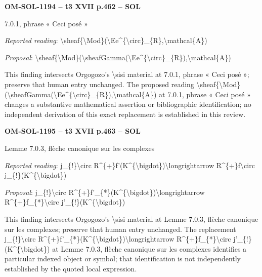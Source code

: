 \par\noindent\textbf{OM-SOL-1194 -- t3 XVII p.462 -- SOL}\par
7.0.1, phrase « Ceci posé »\par
\emph{Reported reading}: \textbackslash{}sheaf\{\textbackslash{}Mod\}(\textbackslash{}Ee\textasciicircum{}\{\textbackslash{}circ\}\_\{R\},\textbackslash{}mathcal\{A\})\par
\emph{Proposal}: \textbackslash{}sheaf\{\textbackslash{}Mod\}(\textbackslash{}sheafGamma(\textbackslash{}Ee\textasciicircum{}\{\textbackslash{}circ\}\_\{R\}),\textbackslash{}mathcal\{A\})\par
This finding intersects Orgogozo's \textbackslash{}sisi material at 7.0.1, phrase « Ceci posé »; preserve that human entry unchanged. The proposed reading \textbackslash{}sheaf\{\textbackslash{}Mod\}(\textbackslash{}sheafGamma(\textbackslash{}Ee\textasciicircum{}\{\textbackslash{}circ\}\_\{R\}),\textbackslash{}mathcal\{A\}) at 7.0.1, phrase « Ceci posé » changes a substantive mathematical assertion or bibliographic identification; no independent derivation of this exact replacement is established in this review.\par
\par\noindent\textbf{OM-SOL-1195 -- t3 XVII p.463 -- SOL}\par
Lemme 7.0.3, flèche canonique sur les complexes\par
\emph{Reported reading}: j\_\{!\}\textbackslash{}circ R\textasciicircum{}\{+\}f'(K\textasciicircum{}\{\textbackslash{}bigdot\})\textbackslash{}longrightarrow R\textasciicircum{}\{+\}f\textbackslash{}circ j\_\{!\}(K\textasciicircum{}\{\textbackslash{}bigdot\})\par
\emph{Proposal}: j\_\{!\}\textbackslash{}circ R\textasciicircum{}\{+\}f'\_\{*\}(K\textasciicircum{}\{\textbackslash{}bigdot\})\textbackslash{}longrightarrow R\textasciicircum{}\{+\}f\_\{*\}\textbackslash{}circ j'\_\{!\}(K\textasciicircum{}\{\textbackslash{}bigdot\})\par
This finding intersects Orgogozo's \textbackslash{}sisi material at Lemme 7.0.3, flèche canonique sur les complexes; preserve that human entry unchanged. The replacement j\_\{!\}\textbackslash{}circ R\textasciicircum{}\{+\}f'\_\{*\}(K\textasciicircum{}\{\textbackslash{}bigdot\})\textbackslash{}longrightarrow R\textasciicircum{}\{+\}f\_\{*\}\textbackslash{}circ j'\_\{!\}(K\textasciicircum{}\{\textbackslash{}bigdot\}) at Lemme 7.0.3, flèche canonique sur les complexes identifies a particular indexed object or symbol; that identification is not independently established by the quoted local expression.\par
